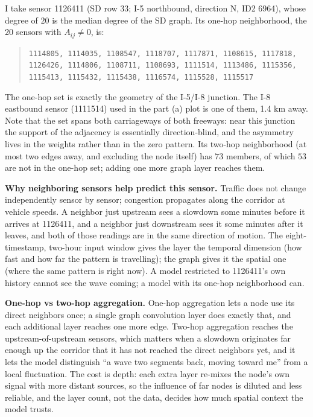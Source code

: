 \documentclass[11pt,letterpaper]{article}
\begin{document}
I take sensor 1126411 (SD row 33; I-5 northbound, direction N, ID2 6964), whose
degree of $20$ is the median degree of the SD graph. Its one-hop neighborhood, the 20 sensors
with $A_{ij} \neq 0$, is:
\begin{quote}
\footnotesize
\texttt{1114805, 1114035, 1108547, 1118707, 1117871, 1108615, 1117818, 1126426, 1114806,
1108711, 1108693, 1111514, 1113486, 1115356, 1115413, 1115432, 1115438, 1116574, 1115528,
1115517}
\end{quote}
The one-hop set is exactly the geometry of the I-5/I-8 junction. The I-8 eastbound sensor (1111514) used in
the part (a) plot is one of them, 1.4 km away. Note that the set spans both carriageways of
both freeways: near this junction the support of the adjacency is essentially
direction-blind, and the asymmetry lives in the weights rather than in the zero pattern. Its
two-hop neighborhood (at most two edges away, and excluding the node itself) has $73$
members, of which $53$ are not in the one-hop set; adding one more graph layer reaches them.

\textbf{Why neighboring sensors help predict this sensor.} Traffic does not change
independently sensor by sensor; congestion propagates along the corridor at vehicle speeds. A
neighbor just upstream sees a slowdown some minutes before it arrives at 1126411, and a
neighbor just downstream sees it some minutes after it leaves, and both of those readings are
in the same direction of motion. The eight-timestamp, two-hour input window gives the layer
the temporal
dimension (how fast and how far the pattern is travelling); the graph gives it the spatial one
(where the same pattern is right now). A model restricted to 1126411's own history cannot see
the wave coming; a model with its one-hop neighborhood can.

\textbf{One-hop vs two-hop aggregation.} One-hop aggregation lets a node use its direct
neighbors once; a single graph convolution layer does exactly that, and each additional layer
reaches one more edge. Two-hop aggregation reaches the upstream-of-upstream sensors, which
matters when a slowdown originates far enough up the corridor that it has not reached the
direct neighbors yet, and it lets the model distinguish ``a wave two segments back, moving
toward me'' from a local fluctuation. The cost is depth: each extra layer re-mixes the node's
own signal with more distant sources, so the influence of far nodes is diluted and less
reliable, and the layer count, not the data, decides how much spatial context the model
trusts.
\end{document}
